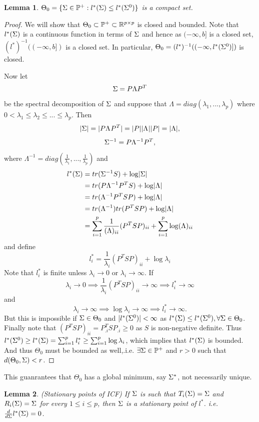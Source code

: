 \documentclass[12pt, leqno]{article}
\providecommand{\abs}[1]{\lvert#1\rvert}
\def\s{\ensuremath\Sigma}
\def\pd{\ensuremath\mathbb{P}^+}
\newtheorem{lemma}{Lemma}[]
\begin{document}
\begin{lemma}
$\Theta_0= \{\s \in \pd: l^*(\s) \leq l^*(\s^0)\}$ is a compact set.
\end{lemma}
\begin{proof}
We will show that $\Theta_0 \subset \pd \subset \mathbb{R}^{p \times
  p}$ is closed and bounded. Note that $l^*(\s)$ is a continuous
function in terms of $\s$ and hence as $(-\infty,b]$ is a closed set,
$(l^*)^{-1} ((-\infty,b])$ is a closed set. In particular,
$\Theta_0 = (l^*)^{-1}((-\infty,l^*(\s^0)])$ is closed. 

Now let 
\[
\s = P \Lambda P^T
\]
be the spectral decomposition of $\s$ and suppose that $\Lambda =
diag(\lambda_1,..., \lambda_p)$ where $0< \lambda_1 \leq \lambda_2 \leq
... \leq \lambda_p$. Then 
\[\abs{\s} = \abs{ P \Lambda^{} P^T} = \abs{P} \abs{\Lambda^{}}
\abs{P} = \abs{\Lambda},
\] 
\[
\s^{-1} = P \Lambda^{-1} P^T,
\] 
where $\Lambda^{-1} =
diag(\frac{1}{\lambda_1},..., \frac{1}{\lambda_p})$
and
\begin{align*}
l^{*}(\s) &= tr(\s^{-1} S) + \log \abs{\s} \\
&=  tr(P \Lambda^{-1} P^T S) + \log \abs{\Lambda} \\
&=  tr(\Lambda^{-1} P^T S P) + \log \abs{\Lambda} \\
&=  tr(\Lambda^{-1}) tr(P^T S P) + \log \abs{\Lambda} \\
&=  \sum_{i=1}^p \frac{1}{(\Lambda)_{ii}} (P^T S P)_{ii} + \sum_{i=1}^p \log (\Lambda)_{ii} 
\end{align*}
and define
\[
l_i^* = \frac{1}{\lambda_{i}} (P^T S P)_{ii} + \log \lambda_{i} 
\]
Note that $l_i^*$ is finite unless $\lambda_i \to 0$ or $\lambda_i \to
\infty$. If 
\[\lambda_i \to 0 \implies \frac{1}{\lambda_{i}} (P^T S
P)_{ii} \to \infty \implies l_i^{*} \to \infty 
\] 
and 
\[\lambda_i
\to \infty \implies \log \lambda_{i} \to \infty \implies l_i^{*} \to \infty.
\] 
But this is impossible if 
$\s \in \Theta_0$ and $\abs{l^*(\s^0)} < \infty $ as $l^*(\s) \leq l^*(\s^0),
\forall \s \in \Theta_0$. Finally note that $(P^T S P)_{ii} =
P_{.i}^TSP_{.i} \geq 0$ as $S$ is non-negative definite.
Thus $l^{*}(\s^0) \geq l^{*}(\s) = \sum_{i=1}^p l_i^* \geq
\sum_{i=1}^p \log \lambda_i$, which implies that $l^{*}(\s)$ is
bounded. And thus $\Theta_0$ must be bounded as well,.i.e. $\exists
\s \in \pd$ and $
r>0$ such that $d(\Theta_0, \s)<r$.
\end{proof}
This guanrantees that $\Theta_0$ has a global minimum, say $\s^*$, not necessarily
unique.
\begin{lemma} \label{lemma:stationaryICF} (Stationary points of ICF) If
  $\s$ is such that $T_i(\s) = \s$ and $R_i(\s) = \s$ for every $1
  \leq i \leq p$, then $\s$ is a stationary point of
  $l^*$. i.e. $\frac{d}{d \s}l^*(\s) = 0$. 
\end{lemma}
\end{document}
